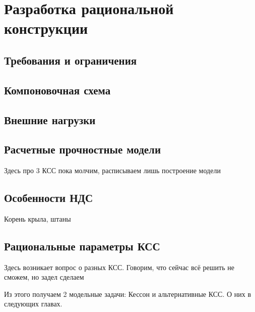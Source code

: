 \chapter{Разработка рациональной конструкции}

\section{Требования и ограничения}



\section{Компоновочная схема}
	

\section{Внешние нагрузки}



\section{Расчетные прочностные модели}
Здесь про 3 КСС пока молчим, расписываем лишь построение модели




\section{Особенности НДС}
Корень крыла, штаны


\section{Рациональные параметры КСС}
Здесь возникает вопрос о разных КСС. Говорим, что сейчас всё решить не сможем, но задел сделаем

Из этого получаем 2 модельные задачи: Кессон и альтернативные КСС. О них в следующих главах.